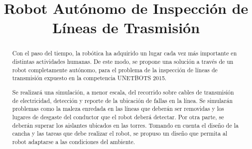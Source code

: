 \documentclass[conference]{IEEEtran}
\begin{document}
%
\title{Robot Autónomo de Inspección de Líneas de Trasmisión }





% 
\author{}








\maketitle


\begin{abstract}
Con el paso del tiempo, la robótica ha adquirido un
lugar cada vez más importante en distintas actividades
humanas. De este modo, se propone una solución a través
de un robot completamente autónomo, para el problema
de la inspección de líneas de transmisión expuesto en la competencia UNETBOTS 2015.

\bigskip

Se realizará una simulación, a menor escala, del recorrido sobre cables de transmisión de electricidad, detección y reporte de la ubicación de fallas en la línea. Se simularán  
problemas como la maleza enredada en las líneas que deberán ser removidas y los lugares de desgaste del conductor que el robot deberá detectar. Por otra parte, se deberán superar los aislantes ubicados en las torres. Tomando en cuenta el diseño de la cancha y las tareas que debe realizar el robot, se propuso un diseño que permita al robot adaptarse a las condiciones del ambiente.
\end{abstract}
\end{document}
